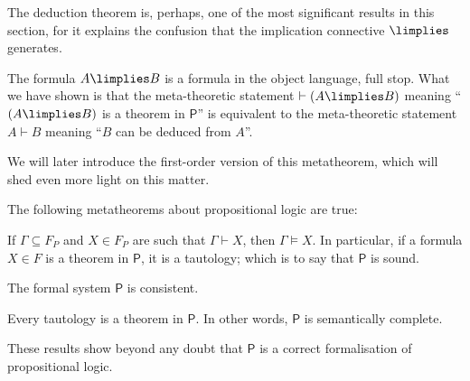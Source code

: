 \begin{para}
\label{remarkdedp}
The deduction theorem is, perhaps, one of the most significant results in this section, for it explains the confusion that the implication connective $\limplies$ generates.

The formula $A\limplies B$ is a formula in the object language, full stop.
What we have shown is that the meta-theoretic statement $\vdash (A\limplies B)$ meaning ``$(A\limplies B)$ is a theorem in $\mathsf{P}$'' is equivalent to the meta-theoretic statement $A\vdash B$ meaning ``$B$ can be deduced from $A$''.

We will later introduce the first-order version of this metatheorem, which will shed even more light on this matter.
\end{para}

\begin{theorem}
\label{pprop}
The following metatheorems about propositional logic are true:
\begin{statements}
\item \label{pprop:sound} If $\Gamma \subseteq F_P$ and $X\in F_P$ are such that $\Gamma \vdash X$, then $\Gamma\vDash X$. In particular, if a formula $X\in F$ is a theorem in $\mathsf{P}$, it is a tautology; which is to say that $\mathsf{P}$ is sound.
\item The formal system $\mathsf{P}$ is consistent.
\item Every tautology is a theorem in $\mathsf{P}$. In other words, $\mathsf{P}$ is semantically complete.
\end{statements}
These results show beyond any doubt that $\mathsf{P}$ is a correct formalisation of propositional logic.
\end{theorem}

